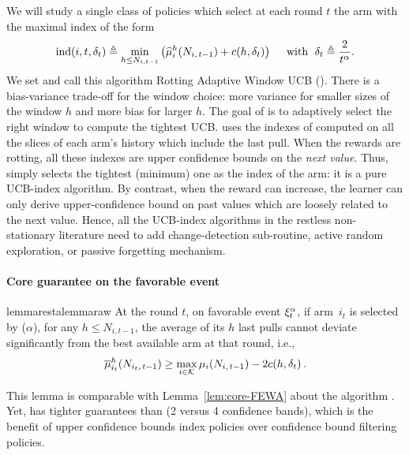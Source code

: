 We will study a single class of policies which select at each round $t$ the arm with the maximal index of the form
\begin{align}
\label{eq:raw_index}
\operatorname{ind}(i,t, \delta_{t}) \triangleq \min_{h\leq N_{i,t-1}}\left( {\widehat{\mu}}_i^h(N_{i,\,t-1}) + c(h,\delta_{t})\right)\quad \text{ with } \; \delta_{t} \triangleq \frac{2}{t^\alpha} .
\end{align}
We set and call this algorithm Rotting Adaptive Window UCB (\RUCB). There is a bias-variance trade-off for the window choice: more variance for smaller sizes of the window $h$ and more bias for larger $h$. The goal of \RUCB is to adaptively select the right window to compute the tightest UCB. \RUCB uses the indexes of \UCBone computed on all the slices of each arm's history which include the last pull. When the rewards are rotting, all these indexes are upper confidence bounds on the \textit{next value}.  Thus, \RUCB simply selects the tightest (minimum) one as the index of the arm: it is a pure UCB-index algorithm. By contrast, when the reward can increase, the learner can only derive upper-confidence bound on past values which are loosely related to the next value. Hence, all the UCB-index algorithms in the restless non-stationary literature need to add change-detection sub-routine, active random exploration, or passive forgetting mechanism. 

\paragraph{Core guarantee on the favorable event}

\begin{restatable}{lemma}{restalemmaraw}
\label{lem:core-RAWUCB}
At the round $t$, on favorable event $\xi^\alpha_t$, if arm~$i_{t}$ is selected by \RUCB($\alpha$), for any $h \leq N_{i,t-1}$,  the average of its $h$ last pulls cannot deviate significantly from the best available arm at that round, i.e.,
%
\begin{equation*}
\overline{\mu}_{i_t}^{h}(N_{i_t,\, t-1}) \geq \max_{i \in \mathcal{K}} \mu_{i}(N_{i,\,t-1}) - 2 c(h, \delta_t)\,.
\end{equation*}
\end{restatable}
This lemma is comparable with Lemma~\ref{lem:core-FEWA} about the algorithm \FEWA. Yet, \RUCB has tighter guarantees than \FEWA (2 versus 4 confidence bands), which is the benefit of upper confidence bounds index policies over confidence bound filtering policies. 

